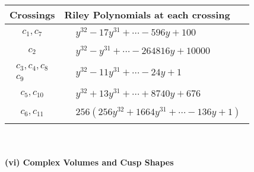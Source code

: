 \documentclass[1p]{elsarticle_modified}
\theoremstyle{definition}
\begin{document}
\begin{tabular}{m{50pt}|m{274pt}}
Crossings & \hspace{64pt}Riley Polynomials at each crossing \\
\hline $$\begin{aligned}c_{1},c_{7}\end{aligned}$$&$\begin{aligned}
&y^{32}-17 y^{31}+\cdots-596 y+100
\end{aligned}$\\
\hline $$\begin{aligned}c_{2}\end{aligned}$$&$\begin{aligned}
&y^{32}- y^{31}+\cdots-264816 y+10000
\end{aligned}$\\
\hline $$\begin{aligned}c_{3},c_{4},c_{8}\\c_{9}\end{aligned}$$&$\begin{aligned}
&y^{32}-11 y^{31}+\cdots-24 y+1
\end{aligned}$\\
\hline $$\begin{aligned}c_{5},c_{10}\end{aligned}$$&$\begin{aligned}
&y^{32}+13 y^{31}+\cdots+8740 y+676
\end{aligned}$\\
\hline $$\begin{aligned}c_{6},c_{11}\end{aligned}$$&$\begin{aligned}
&256(256 y^{32}+1664 y^{31}+\cdots-136 y+1)
\end{aligned}$\\
\hline
\end{tabular}\\~\\
\newpage\flushleft \textbf{(vi) Complex Volumes and Cusp Shapes}
\end{document}
